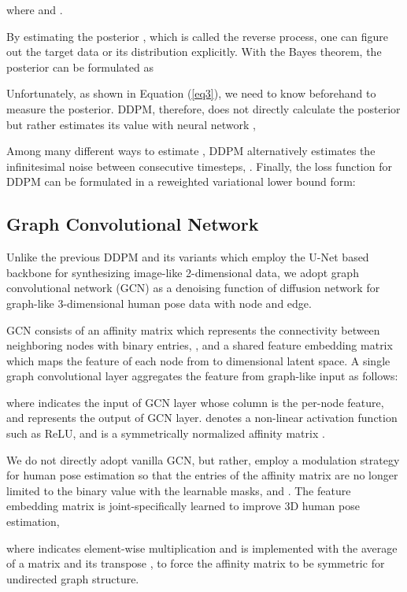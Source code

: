\documentclass[letterpaper, 10 pt, conference]{ieeeconf}
\begin{document}
where  and .

By estimating the posterior , which is called the reverse process, one can figure out the target data  or its distribution explicitly.
With the Bayes theorem, the posterior  can be formulated as


Unfortunately, as shown in Equation (\ref{eq3}), we need to know  beforehand to measure the posterior.
DDPM, therefore, does not directly calculate the posterior but rather estimates its value with neural network ,


Among many different ways to estimate , DDPM alternatively estimates the infinitesimal noise between consecutive timesteps, . Finally, the loss function for DDPM can be formulated in a reweighted variational lower bound form:


\subsection{Graph Convolutional Network}
Unlike the previous DDPM \cite{ho2020denoising} and its variants \cite{song2020denoising, rombach2022high, dhariwal2021diffusion} which employ the U-Net \cite{ronneberger2015u} based backbone for synthesizing image-like 2-dimensional data, 
we adopt graph convolutional network (GCN) \cite{kipf2016semi} as a denoising function of diffusion network for graph-like 3-dimensional human pose data with node and edge.

GCN consists of an affinity matrix  which represents the connectivity between neighboring nodes with binary entries, , and a shared feature embedding matrix  which maps the feature of each node from  to  dimensional latent space.
A single graph convolutional layer aggregates the feature from graph-like input as follows:

where  indicates the input of GCN layer whose column is the per-node feature, and  represents the output of GCN layer.
 denotes a non-linear activation function such as ReLU, and  is a symmetrically normalized affinity matrix \cite{kipf2016semi}.

We do not directly adopt vanilla GCN, but rather, employ a modulation strategy for human pose estimation \cite{zou2021modulated} so that the entries of the affinity matrix are no longer limited to the binary value with the learnable masks,  and .
The feature embedding matrix  is joint-specifically learned to improve 3D human pose estimation,

where  indicates element-wise multiplication and  is implemented with the average of a matrix and its transpose , to force the affinity matrix to be symmetric for undirected graph structure.
\end{document}
